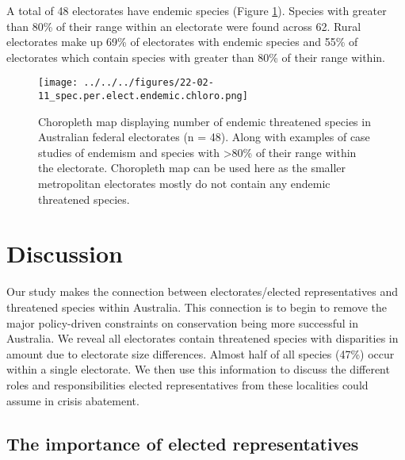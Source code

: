 \documentclass[a4paper,11pt]{article}
\begin{document}
A total of 48 electorates have endemic species (Figure \ref{fig:endemic_chloro}). Species with greater than 80\% of their range within an electorate were found across 62. Rural electorates make up 69\% of electorates with endemic species and 55\% of electorates which contain species with greater than 80\% of their range within.

\begin{figure}[H]
	\centering
    \texttt{[image: ../../../figures/22-02-11\_spec.per.elect.endemic.chloro.png]}
    \caption{Choropleth map displaying number of endemic threatened species in Australian federal electorates (n = 48). Along with examples of case studies of endemism and species with >80\% of their range within the electorate. Choropleth map can be used here as the smaller metropolitan electorates mostly do not contain any endemic threatened species.}
    \label{fig:endemic_chloro}
\end{figure}

\section{Discussion}

Our study makes the connection between electorates/elected representatives and threatened species within Australia. This connection is  to begin to remove the major policy-driven constraints on conservation being more successful in Australia. We reveal all electorates contain threatened species with disparities in amount due to electorate size differences. Almost half of all species (47\%) occur within a single electorate. We then use this information to discuss the different roles and responsibilities elected representatives from these localities could assume in crisis abatement.

\subsection{The importance of elected representatives}
\end{document}
